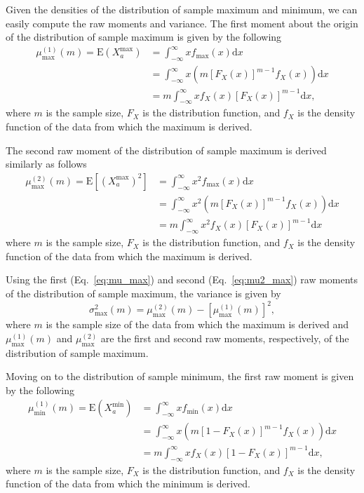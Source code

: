 \documentclass[10pt,letterpaper]{article}
\begin{document}
Given the densities of the distribution of sample maximum and minimum, we can easily compute the raw moments and variance. The first moment about the origin of the distribution of sample maximum is given by the following
%
\begin{equation}\label{eq:mu_max}
\begin{aligned}
\mu^{(1)}_\text{max}(m) = \text{E}(X^\text{max}_a) &= \int_{-\infty}^{\infty}x f_\text{max}(x)\text{d}x \\
&= \int_{-\infty}^{\infty}x \left(m [F_X(x)]^{m-1} f_X(x)\right)\text{d}x \\
&= m \int_{-\infty}^{\infty}x f_X(x) [F_X(x)]^{m-1}\text{d}x,
\end{aligned}
\end{equation}
%
where $m$ is the sample size, $F_X$ is the distribution function, and $f_X$ is the density function of the data from which the maximum is derived.

The second raw moment of the distribution of sample maximum is derived similarly as follows
%
\begin{equation}\label{eq:mu2_max}
\begin{aligned}
\mu^{(2)}_\text{max}(m) = \text{E}[(X^\text{max}_a)^2] &= \int_{-\infty}^{\infty}x^2 f_\text{max}(x)\text{d}x \\
&= \int_{-\infty}^{\infty}x^2 \left(m [F_X(x)]^{m-1} f_X(x)\right)\text{d}x \\
&= m \int_{-\infty}^{\infty}x^2 f_X(x) [F_X(x)]^{m-1}\text{d}x
\end{aligned}
\end{equation}
%
where $m$ is the sample size, $F_X$ is the distribution function, and $f_X$ is the density function of the data from which the maximum is derived.

Using the first (Eq.~\ref{eq:mu_max}) and second (Eq.~\ref{eq:mu2_max}) raw moments of the distribution of sample maximum, the variance is given by
\begin{equation}\label{eq:sig_max}
\sigma^2_\text{max}(m) = \mu^{(2)}_\text{max}(m) - \left[\mu^{(1)}_\text{max}(m)\right]^2,
\end{equation}
%
where $m$ is the sample size of the data from which the maximum is derived and $\mu^{(1)}_\text{max}(m)$ and $\mu^{(2)}_\text{max}$ are the first and second raw moments, respectively, of the distribution of sample maximum.

Moving on to the distribution of sample minimum, the first raw moment is given by the following
%
\begin{equation}\label{eq:mu_min}
\begin{aligned}
\mu^{(1)}_\text{min}(m) = \text{E}(X^\text{min}_a) &= \int_{-\infty}^{\infty}x f_\text{min}(x)\text{d}x \\
&= \int_{-\infty}^{\infty}x \left(m [1 - F_X(x)]^{m-1} f_X(x)\right)\text{d}x \\
&= m \int_{-\infty}^{\infty}x f_X(x) [1 - F_X(x)]^{m-1}\text{d}x,
\end{aligned}
\end{equation}
%
where $m$ is the sample size, $F_X$ is the distribution function, and $f_X$ is the density function of the data from which the minimum is derived.
\end{document}
